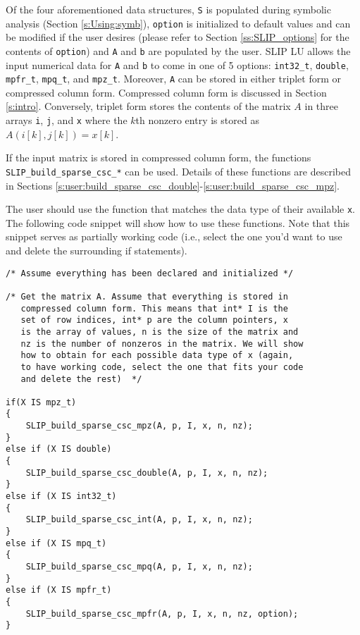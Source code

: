 \documentclass[12pt]{article}
\theoremstyle{definition}
\begin{document}
Of the four aforementioned data structures, \verb|S| is populated during symbolic analysis (Section \ref{s:Using:symb}), \verb|option| is initialized to default values and can be modified if the user desires (please refer to Section \ref{ss:SLIP_options} for the contents of \verb|option|) and \verb|A| and \verb|b| are populated by the user. SLIP LU allows the input numerical data for \verb|A| and \verb|b| to come in one of 5 options: \verb|int32_t|, \verb|double|, \verb|mpfr_t|, \verb|mpq_t|, and \verb|mpz_t|. Moreover, \verb|A| can be stored in either triplet form or compressed column form. Compressed column form is discussed in Section \ref{s:intro}. Conversely, triplet form stores the contents of the matrix $A$ in three arrays \verb|i|, \verb|j|, and \verb|x| where the $k$th nonzero entry is stored as $A ( i[k], j[k]) = x[k]$.


If the input matrix is stored in compressed column form, the functions \verb|SLIP_build_sparse_csc_*| can be used. Details of these functions are described in Sections \ref{s:user:build_sparse_csc_double}-\ref{s:user:build_sparse_csc_mpz}.

The user should use the function that matches the data type of their available \verb|x|. The following code snippet will show how to use these functions. Note that this snippet serves as partially working code (i.e., select the one you'd want to use and delete the surrounding if statements).

\begin{verbatim}
/* Assume everything has been declared and initialized */

/* Get the matrix A. Assume that everything is stored in
   compressed column form. This means that int* I is the
   set of row indices, int* p are the column pointers, x
   is the array of values, n is the size of the matrix and
   nz is the number of nonzeros in the matrix. We will show
   how to obtain for each possible data type of x (again,
   to have working code, select the one that fits your code
   and delete the rest)  */

if(X IS mpz_t)
{
    SLIP_build_sparse_csc_mpz(A, p, I, x, n, nz);
}
else if (X IS double)
{
    SLIP_build_sparse_csc_double(A, p, I, x, n, nz);
}
else if (X IS int32_t)
{
    SLIP_build_sparse_csc_int(A, p, I, x, n, nz);
}
else if (X IS mpq_t)
{
    SLIP_build_sparse_csc_mpq(A, p, I, x, n, nz);
}
else if (X IS mpfr_t)
{
    SLIP_build_sparse_csc_mpfr(A, p, I, x, n, nz, option);
}

\end{verbatim}
\end{document}
